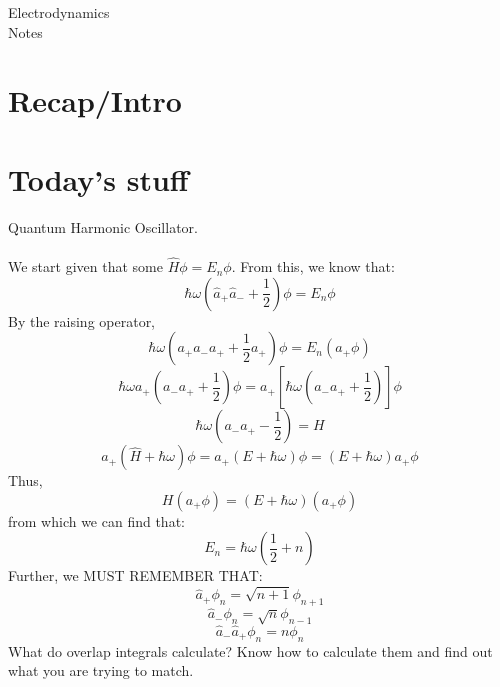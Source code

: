 \documentclass{article}
\begin{document}
\thispagestyle{fancy}
\begin{center}\LARGE{Electrodynamics \\ Notes}\end{center}
\section{Recap/Intro}
\section{Today's stuff}
Quantum Harmonic Oscillator.
\\\\
We start given that some $\hat H\phi = E_n\phi$. From this, we know that:
\[\hbar \omega (\hat a _+ \hat a _- + \frac 1 2)\phi = E_n \phi\]
By the raising operator, 
\[\hbar \omega(a_+ a_- a_+ + \frac 1 2 a_+) \phi = E_n(a_+ \phi)\]
\[\hbar \omega a_+ (a_- a_+ + \frac 1 2)\phi = a_+ \left[ \hbar \omega (a_- a_+ + \frac 1 2)\right]\phi\]
\[\hbar \omega (a_-a_+ - \frac 1 2) = H\]
\[a_+(\hat H + \hbar \omega)\phi = a_+ (E+\hbar \omega) \phi = (E+\hbar \omega)a_+ \phi\]
Thus, 
\[H(a_+\phi) = (E+\hbar \omega)(a_+\phi)\]
from which we can find that:
\[E_n = \hbar \omega\left(\frac 1 2 + n\right)\]
Further, we MUST REMEMBER THAT:
\[\hat a_+ \phi_n = \sqrt{n+1} \phi_{n+1}\]
\[\hat a_- \phi_n = \sqrt{n} \phi_{n-1}\]
\[\hat a_- \hat a_+ \phi_n = n \phi _n\]
What do overlap integrals calculate? Know how to calculate them and find out what you are trying to match.
\end{document}
